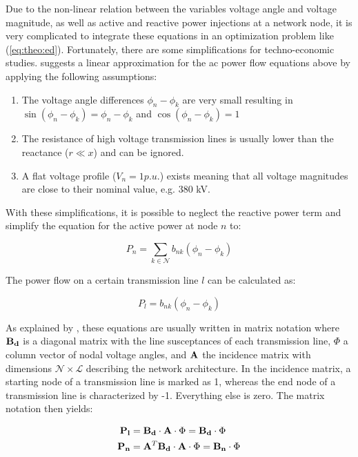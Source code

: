 Due to the non-linear relation between the variables voltage angle and voltage magnitude, as well as active and reactive power injections at a network node, it is very complicated to integrate these equations in an optimization problem like (\ref{eq:theo:ed}). Fortunately, there are some simplifications for techno-economic studies. \citet{vanhertem2006} suggests a linear approximation for the \gls{ac} power flow equations above by applying the following assumptions:

\begin{enumerate}
	\item The voltage angle differences $\phi_n-\phi_k$ are very small resulting in $\sin{(\phi_n-\phi_k)} = \phi_n-\phi_k$ and $\cos{(\phi_n-\phi_k)} = 1$
	\item The resistance of high voltage transmission lines is usually lower than the reactance ($r \ll x$) and can be ignored.
	\item A flat voltage profile ($V_n = 1 p.u.$) exists meaning that all voltage magnitudes are close to their nominal value, e.g. 380 kV.
\end{enumerate}

With these simplifications, it is possible to neglect the reactive power term and simplify the equation for the active power at node $n$ to:

\begin{equation}
	P_n = \sum_{k \in \mathcal{N}} b_{nk}(\phi_n-\phi_k)
\end{equation}

The power flow on a certain transmission line $l$ can be calculated as:

\begin{equation}
	P_l = b_{nk}(\phi_n-\phi_k)
\end{equation}

As explained by \citet{weinhold2022}, these equations are usually written in matrix notation where $\vb{B_d}$ is a diagonal matrix with the line susceptances of each transmission line, $\Phi$ a column vector of nodal voltage angles, and $\vb{A}$ the incidence matrix with dimensions $\mathcal{N} \times \mathcal{L}$ describing the network architecture. In the incidence matrix, a starting node of a transmission line is marked as 1, whereas the end node of a transmission line is characterized by -1. Everything else is zero. The matrix notation then yields:

\begin{subequations}
	\begin{align}
		\vb{P_l} &= \vb{B_d} \cdot \vb{A} \cdot \Phi = \vb{B_d} \cdot \Phi \\
		\vb{P_n} &= \vb{A}^T \vb{B_d} \cdot \vb{A} \cdot \Phi = \vb{B_n} \cdot \Phi \label{eq:theo:nodal-power:matrix}
	\end{align}
\end{subequations}

